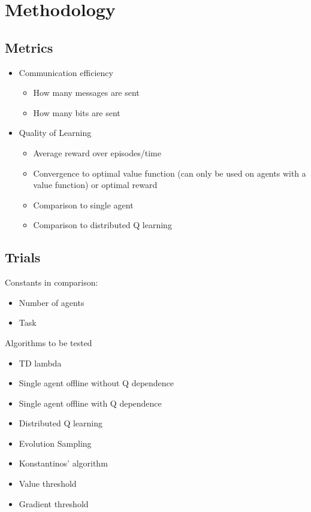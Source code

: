 \chapter{Methodology}

\section{Metrics}
\begin{itemize}
    \item Communication efficiency
    \begin{itemize}
        \item How many messages are sent
        \item How many bits are sent
    \end{itemize}
    \item Quality of Learning
    \begin{itemize}
        \item Average reward over episodes/time
        \item Convergence to optimal value function (can only be used on agents with a value function) or optimal reward
        \item Comparison to single agent
        \item Comparison to distributed Q learning
    \end{itemize}


\end{itemize}

\section{Trials}

Constants in comparison:
\begin{itemize}
    \item Number of agents
    \item Task
\end{itemize}

\noindent Algorithms to be tested
\begin{itemize}
    \item TD lambda
    \item Single agent offline without Q dependence
    \item Single agent offline with Q dependence
    \item Distributed Q learning
    \item Evolution Sampling
    \item Konstantinos' algorithm
    \item Value threshold
    \item Gradient threshold
\end{itemize}

